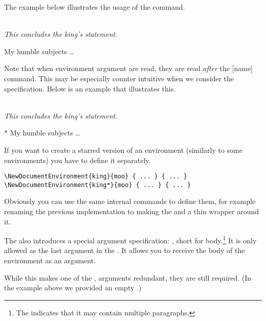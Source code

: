The example below illustrates the usage of the 
command.
\begin{example}
 {%
  \\[1em]%
  \emph{This concludes
    the king's statement.}%
}

\begin{king}
My humble subjects \ldots
\end{king}
\end{example}

Note that when environment argument are read, they are read \emph{after} the
[name] command. This may be especially counter intuitive when we
consider the  specification. Below is an example that illustrates
this.

\begin{example}
 {%
  \\[1em]%
  \emph{This concludes
    the king's statement.}%
}

\begin{king}*
My humble subjects \ldots
\end{king}
\end{example}

If you want to create a starred version of an environment (similarly to some
 environments) you have to define it separately.
\begin{verbatim}
\NewDocumentEnvironment{king}{moo} { ... } { ... }
\NewDocumentEnvironment{king*}{moo} { ... } { ... }
\end{verbatim}
Obviously you can use the same internal commands to define them, for example
renaming the previous implementation to  making the
 and  a thin wrapper around it.

The  also introduces a special argument
specification: , short for body.\footnote{The \cargv{+} indicates
that it may contain multiple paragraphs.} It is only allowed as the last
argument in the . It allows you to receive the body of the
environment as an argument.
While this makes one of the ,  arguments redundant,
they are still required. (In the example above we provided an empty .)

